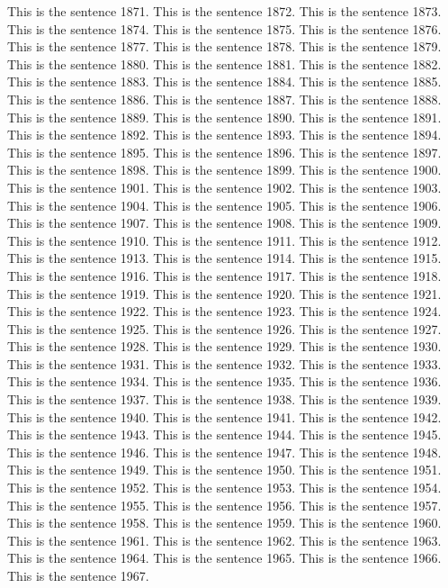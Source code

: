 \documentclass{article}
\begin{document}
This is the sentence 1871.
This is the sentence 1872.
This is the sentence 1873.
This is the sentence 1874.
This is the sentence 1875.
This is the sentence 1876.
This is the sentence 1877.
This is the sentence 1878.
This is the sentence 1879.
This is the sentence 1880.
This is the sentence 1881.
This is the sentence 1882.
This is the sentence 1883.
This is the sentence 1884.
This is the sentence 1885.
This is the sentence 1886.
This is the sentence 1887.
This is the sentence 1888.
This is the sentence 1889.
This is the sentence 1890.
This is the sentence 1891.
This is the sentence 1892.
This is the sentence 1893.
This is the sentence 1894.
This is the sentence 1895.
This is the sentence 1896.
This is the sentence 1897.
This is the sentence 1898.
This is the sentence 1899.
This is the sentence 1900.
This is the sentence 1901.
This is the sentence 1902.
This is the sentence 1903.
This is the sentence 1904.
This is the sentence 1905.
This is the sentence 1906.
This is the sentence 1907.
This is the sentence 1908.
This is the sentence 1909.
This is the sentence 1910.
This is the sentence 1911.
This is the sentence 1912.
This is the sentence 1913.
This is the sentence 1914.
This is the sentence 1915.
This is the sentence 1916.
This is the sentence 1917.
This is the sentence 1918.
This is the sentence 1919.
This is the sentence 1920.
This is the sentence 1921.
This is the sentence 1922.
This is the sentence 1923.
This is the sentence 1924.
This is the sentence 1925.
This is the sentence 1926.
This is the sentence 1927.
This is the sentence 1928.
This is the sentence 1929.
This is the sentence 1930.
This is the sentence 1931.
This is the sentence 1932.
This is the sentence 1933.
This is the sentence 1934.
This is the sentence 1935.
This is the sentence 1936.
This is the sentence 1937.
This is the sentence 1938.
This is the sentence 1939.
This is the sentence 1940.
This is the sentence 1941.
This is the sentence 1942.
This is the sentence 1943.
This is the sentence 1944.
This is the sentence 1945.
This is the sentence 1946.
This is the sentence 1947.
This is the sentence 1948.
This is the sentence 1949.
This is the sentence 1950.
This is the sentence 1951.
This is the sentence 1952.
This is the sentence 1953.
This is the sentence 1954.
This is the sentence 1955.
This is the sentence 1956.
This is the sentence 1957.
This is the sentence 1958.
This is the sentence 1959.
This is the sentence 1960.
This is the sentence 1961.
This is the sentence 1962.
This is the sentence 1963.
This is the sentence 1964.
This is the sentence 1965.
This is the sentence 1966.
This is the sentence 1967.
\end{document}

